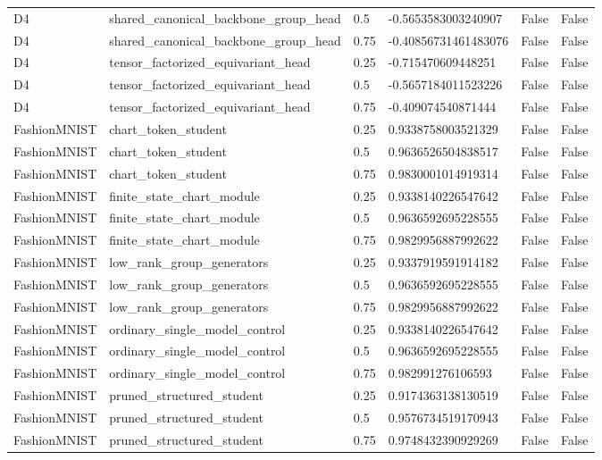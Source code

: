 \begin{table}[t]
\begin{tabular}{llllll}
D4 & shared\_canonical\_backbone\_group\_head & 0.5 & -0.5653583003240907 & False & False \\
D4 & shared\_canonical\_backbone\_group\_head & 0.75 & -0.40856731461483076 & False & False \\
D4 & tensor\_factorized\_equivariant\_head & 0.25 & -0.715470609448251 & False & False \\
D4 & tensor\_factorized\_equivariant\_head & 0.5 & -0.5657184011523226 & False & False \\
D4 & tensor\_factorized\_equivariant\_head & 0.75 & -0.409074540871444 & False & False \\
FashionMNIST & chart\_token\_student & 0.25 & 0.9338758003521329 & False & False \\
FashionMNIST & chart\_token\_student & 0.5 & 0.9636526504838517 & False & False \\
FashionMNIST & chart\_token\_student & 0.75 & 0.9830001014919314 & False & False \\
FashionMNIST & finite\_state\_chart\_module & 0.25 & 0.9338140226547642 & False & False \\
FashionMNIST & finite\_state\_chart\_module & 0.5 & 0.9636592695228555 & False & False \\
FashionMNIST & finite\_state\_chart\_module & 0.75 & 0.9829956887992622 & False & False \\
FashionMNIST & low\_rank\_group\_generators & 0.25 & 0.9337919591914182 & False & False \\
FashionMNIST & low\_rank\_group\_generators & 0.5 & 0.9636592695228555 & False & False \\
FashionMNIST & low\_rank\_group\_generators & 0.75 & 0.9829956887992622 & False & False \\
FashionMNIST & ordinary\_single\_model\_control & 0.25 & 0.9338140226547642 & False & False \\
FashionMNIST & ordinary\_single\_model\_control & 0.5 & 0.9636592695228555 & False & False \\
FashionMNIST & ordinary\_single\_model\_control & 0.75 & 0.982991276106593 & False & False \\
FashionMNIST & pruned\_structured\_student & 0.25 & 0.9174363138130519 & False & False \\
FashionMNIST & pruned\_structured\_student & 0.5 & 0.9576734519170943 & False & False \\
FashionMNIST & pruned\_structured\_student & 0.75 & 0.9748432390929269 & False & False \\

\end{tabular}
\end{table}
